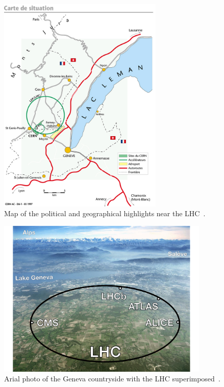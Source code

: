 \begin{figure}[ht]
 \begin{center}
    \includegraphics[width=0.70\textwidth]{figures/experiment/lhc-pho-1997-169.jpg}
      \end{center}
\caption{Map of the political and geographical highlights near the LHC~\cite{Dailler:842399}.}
\label{fig:lhc_mapwithcities}
\end{figure}

\begin{figure}[ht]
 \begin{center}
    \includegraphics[width=0.90\textwidth]{figures/experiment/lhc-switzerland.pdf}
      \end{center}
\caption{Arial photo of the Geneva countryside with the LHC superimposed~\cite{Tuna:thesis}.}
\label{fig:lhc_map_tuna}
\end{figure}

